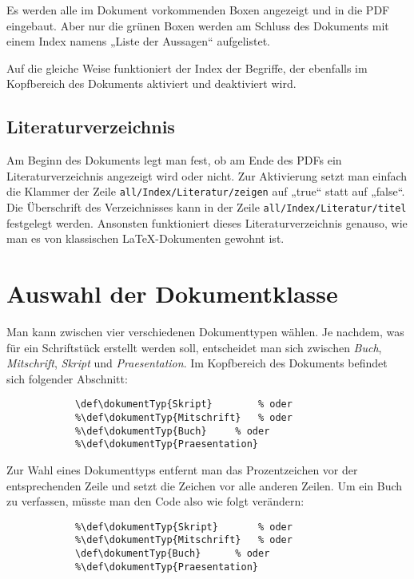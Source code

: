 				Es werden alle im Dokument vorkommenden Boxen angezeigt und in die PDF eingebaut. Aber nur die grünen Boxen werden am Schluss des Dokuments mit einem Index namens „Liste der Aussagen“ aufgelistet. 
				
				Auf die gleiche Weise funktioniert der Index der Begriffe, der ebenfalls im Kopfbereich des Dokuments aktiviert und deaktiviert wird. 
				
				
			\subsection{Literaturverzeichnis}
			
				Am Beginn des Dokuments legt man fest, ob am Ende des PDFs ein Literaturverzeichnis angezeigt wird oder nicht. Zur Aktivierung setzt man einfach die Klammer der Zeile \texttt{all/Index/Literatur/zeigen} auf „true“ statt auf „false“. Die Überschrift des Verzeichnisses kann in der Zeile \texttt{all/Index/Literatur/titel} festgelegt werden. Ansonsten funktioniert dieses Literaturverzeichnis genauso, wie man es von klassischen \LaTeX{}-Dokumenten gewohnt ist. 
		
		\section{Auswahl der Dokumentklasse}
		
			Man kann zwischen vier verschiedenen Dokumenttypen wählen. Je nachdem, was für ein Schriftstück erstellt werden soll, entscheidet man sich zwischen \emph{Buch}, \emph{Mitschrift}, \emph{Skript} und \emph{Praesentation}. Im Kopfbereich des Dokuments befindet sich folgender Abschnitt: 
			
			\begin{verbatim}
			\def\dokumentTyp{Skript}		% oder
			%\def\dokumentTyp{Mitschrift}	% oder
			%\def\dokumentTyp{Buch}		% oder
			%\def\dokumentTyp{Praesentation}
			\end{verbatim}
			
			Zur Wahl eines Dokumenttyps entfernt man das Prozentzeichen vor der entsprechenden Zeile und setzt die Zeichen vor alle anderen Zeilen. Um ein Buch zu verfassen, müsste man den Code also wie folgt verändern: 
			
			\begin{verbatim}
			%\def\dokumentTyp{Skript}		% oder
			%\def\dokumentTyp{Mitschrift}	% oder
			\def\dokumentTyp{Buch}		% oder
			%\def\dokumentTyp{Praesentation}
			\end{verbatim}
			
